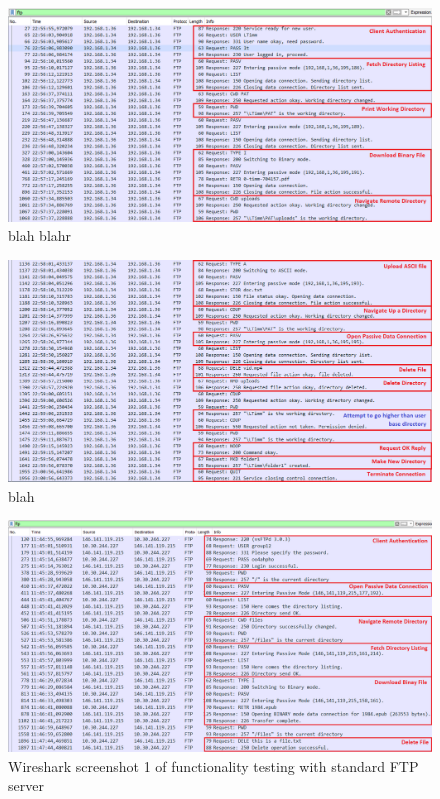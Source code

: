 \documentclass[10pt,twocolumn]{witseiepaper}
\begin{document}
\begin{appendix}
\begin{figure}[h]
	\centering
	\includegraphics[width=0.9\columnwidth]{ClientServer1anno.png}
	\caption{blah blahr}
	\raggedright
	\label{fig:ourWS1}
\end{figure}

\begin{figure}[h]
	\centering
	\includegraphics[width=0.9\columnwidth]{ClientServer2anno.png}
	\caption{blah}
	\raggedright
	\label{fig:ourWS2}
\end{figure}

\begin{figure}[h]
	\centering
	\includegraphics[width=0.9\columnwidth]{WitsCaptureAnno2.png}
	\caption{Wireshark screenshot 1 of functionality testing with standard FTP server}
	\raggedright
	\label{fig:WitsWS1}
\end{figure}


\end{appendix}
\end{document}
